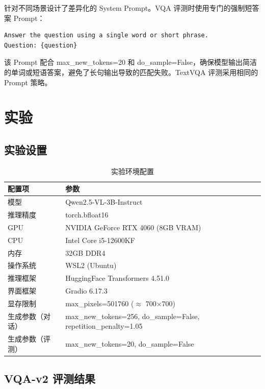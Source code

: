 \documentclass{SYSUReport}
\begin{document}
针对不同场景设计了差异化的 System Prompt。VQA 评测时使用专门的强制短答案 Prompt：

\begin{lstlisting}[caption={VQA评测专用 Prompt},label={lst:vqa_prompt}]
Answer the question using a single word or short phrase.
Question: {question}
\end{lstlisting}

该 Prompt 配合 max\_new\_tokens=20 和 do\_sample=False，确保模型输出简洁的单词或短语答案，避免了长句输出导致的匹配失败。TextVQA 评测采用相同的 Prompt 策略。

\section{实验}

\subsection{实验设置}

\begin{table}[H]
    \centering
    \caption{实验环境配置}
    \label{tab:env}
    \begin{tabular}{lp{9cm}}
        \toprule
        配置项 & 参数 \\
        \midrule
        模型 & Qwen2.5-VL-3B-Instruct \\
        推理精度 & torch.bfloat16 \\
        GPU & NVIDIA GeForce RTX 4060 (8GB VRAM) \\
        CPU & Intel Core i5-12600KF \\
        内存 & 32GB DDR4 \\
        操作系统 & WSL2 (Ubuntu) \\
        推理框架 & HuggingFace Transformers 4.51.0 \\
        界面框架 & Gradio 6.17.3 \\
        \midrule
        显存限制 & max\_pixels=501760 ($\approx$ 700$\times$700) \\
        生成参数（对话） & max\_new\_tokens=256, do\_sample=False, repetition\_penalty=1.05 \\
        生成参数（评测） & max\_new\_tokens=20, do\_sample=False \\
        \bottomrule
    \end{tabular}
\end{table}

\subsection{VQA-v2 评测结果}
\end{document}

